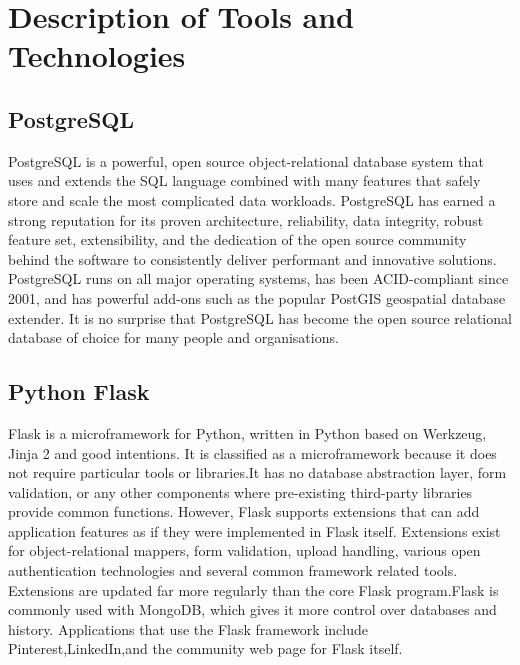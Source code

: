 \chapter{Description of Tools and Technologies}

\section{PostgreSQL}
PostgreSQL is a powerful, open source object-relational database system that uses and extends the SQL language combined with many features that safely store and scale the most complicated data workloads.
PostgreSQL has earned a strong reputation for its proven architecture, reliability, data integrity, robust feature set, extensibility, and the dedication of the open source community behind the software to consistently deliver performant and innovative solutions. PostgreSQL runs on all major operating systems, has been ACID-compliant since 2001, and has powerful add-ons such as the popular PostGIS geospatial database extender. It is no surprise that PostgreSQL has become the open source relational database of choice for many people and organisations.

\thispagestyle{fancy}

\section{Python Flask}
Flask is a microframework for Python, written in Python based on Werkzeug, Jinja 2 and good intentions.
It is classified as a microframework because it does not require particular tools or libraries.It has no database abstraction layer, form validation, or any other components where pre-existing third-party libraries provide common functions. However, Flask supports extensions that can add application features as if they were implemented in Flask itself. Extensions exist for object-relational mappers, form validation, upload handling, various open authentication technologies and several common framework related tools. Extensions are updated far more regularly than the core Flask program.Flask is commonly used with MongoDB, which gives it more control over databases and history.
Applications that use the Flask framework include Pinterest,LinkedIn,and the community web page for Flask itself.

\thispagestyle{fancy}

